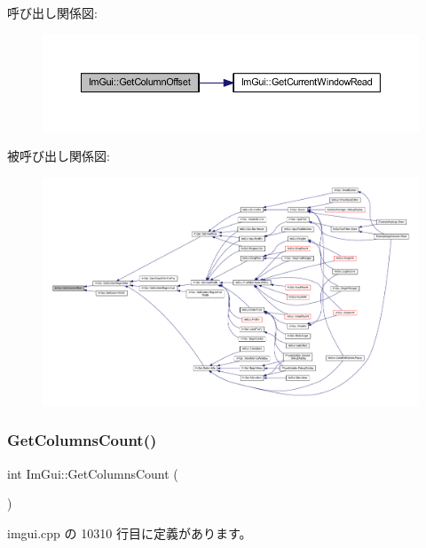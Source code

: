 呼び出し関係図\+:\nopagebreak
\begin{figure}[H]
\begin{center}
\leavevmode
\includegraphics[width=350pt]{namespace_im_gui_a79c22e9c5c208b6c9534a273be71a9e6_cgraph}
\end{center}
\end{figure}
被呼び出し関係図\+:\nopagebreak
\begin{figure}[H]
\begin{center}
\leavevmode
\includegraphics[width=350pt]{namespace_im_gui_a79c22e9c5c208b6c9534a273be71a9e6_icgraph}
\end{center}
\end{figure}
\mbox{\label{namespace_im_gui_a3c2998ad9527948a4e4166c4f7db9ec9}} 
\subsubsection{\texorpdfstring{Get\+Columns\+Count()}{GetColumnsCount()}}
{\footnotesize\ttfamily int Im\+Gui\+::\+Get\+Columns\+Count (\begin{DoxyParamCaption}{ }\end{DoxyParamCaption})}



 imgui.\+cpp の 10310 行目に定義があります。

